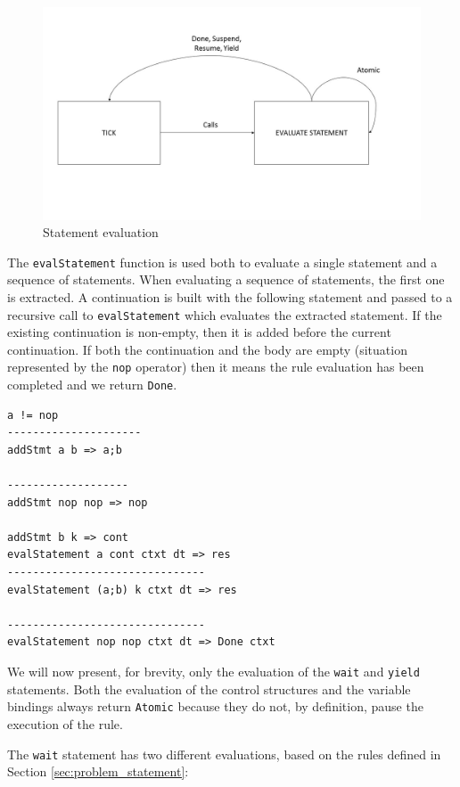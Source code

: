 \begin{figure}
	\centering
	\includegraphics[scale=0.25]{Pictures/statement_evaluation}
	\caption{Statement evaluation}
	\label{fig:statement_evaluation}
\end{figure}

\noindent
The \texttt{evalStatement} function is used both to evaluate a single statement and a sequence of statements. When evaluating a sequence of statements, the first one is extracted. A continuation is built with the following statement and passed to a recursive call to \texttt{evalStatement} which evaluates the extracted statement. If the existing continuation is non-empty, then it is added before the current continuation. If both the continuation and the body are empty (situation represented by the \texttt{nop} operator) then it means the rule evaluation has been completed and we return \texttt{Done}.

\begin{lstlisting}
a != nop
---------------------
addStmt a b => a;b

-------------------
addStmt nop nop => nop

addStmt b k => cont
evalStatement a cont ctxt dt => res
-------------------------------
evalStatement (a;b) k ctxt dt => res

-------------------------------
evalStatement nop nop ctxt dt => Done ctxt
\end{lstlisting}

\noindent
We will now present, for brevity, only the evaluation of the \texttt{wait} and \texttt{yield} statements. Both the evaluation of the control structures and the variable bindings always return \texttt{Atomic} because they do not, by definition, pause the execution of the rule.

The \texttt{wait} statement has two different evaluations, based on the rules defined in Section \ref{sec:problem_statement}: 

